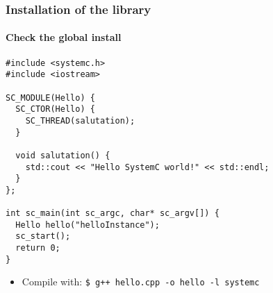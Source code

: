 \begin{frame}[fragile]
\frametitle{Installation of the library}
\framesubtitle{Check the global install}
{ \scriptsize 
\begin{verbatim}
#include <systemc.h>
#include <iostream>

SC_MODULE(Hello) {
  SC_CTOR(Hello) {
    SC_THREAD(salutation);
  }

  void salutation() {
    std::cout << "Hello SystemC world!" << std::endl;
  }
};

int sc_main(int sc_argc, char* sc_argv[]) {
  Hello hello("helloInstance");
  sc_start();
  return 0;
}
\end{verbatim}
\begin{itemize}
\item Compile with: \texttt{\$ g++ hello.cpp -o hello -l systemc}
\end{itemize}
}

\end{frame}
